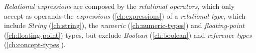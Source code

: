 \emph{Relational expressions} are composed by the \emph{relational operators},
which only accept as operands the \emph{expressions} (\ref{ch:expressions})
of a \emph{relational type},
which include \emph{String} (\ref{ch:string}),
the \emph{numeric} (\ref{ch:numeric-types})
and \emph{floating-point} (\ref{ch:floating-point}) types,
but exclude \emph{Boolean} (\ref{ch:boolean})
and \emph{reference types} (\ref{ch:concept-types}).
